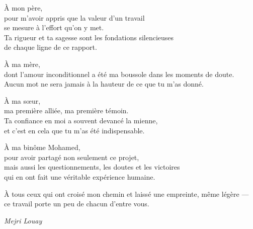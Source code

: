 \begin{center}
\begin{minipage}{0.9\textwidth}
\small
\itshape
{}

À mon père,\\
pour m'avoir appris que la valeur d'un travail\\
se mesure à l'effort qu'on y met.\\
Ta rigueur et ta sagesse sont les fondations silencieuses\\
de chaque ligne de ce rapport.\\

\vspace{0.1cm}

À ma mère,\\
dont l'amour inconditionnel a été ma boussole dans les moments de doute.\\
Aucun mot ne sera jamais à la hauteur de ce que tu m'as donné.\\

\vspace{0.1cm}

À ma sœur,\\
ma première alliée, ma première témoin.\\
Ta confiance en moi a souvent devancé la mienne,\\
et c'est en cela que tu m'as été indispensable.\\

\vspace{0.1cm}

À ma binôme Mohamed,\\
pour avoir partagé non seulement ce projet,\\
mais aussi les questionnements, les doutes et les victoires\\
qui en ont fait une véritable expérience humaine.\\

\vspace{0.1cm}

À tous ceux qui ont croisé mon chemin et laissé une empreinte, même légère ---\\
ce travail porte un peu de chacun d'entre vous.

\end{minipage}
\end{center}
\begin{flushright}
\textit{Mejri Louay}
\end{flushright}
